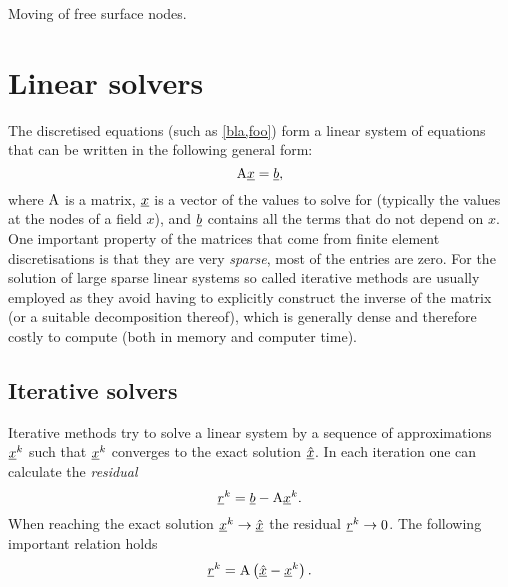 Moving of free surface nodes.

\section{Linear solvers} \label{ND_Linear_solvers}
The discretised equations (such as \eqref{bla,foo}) form
a linear system of equations that can be written
in the following general form:
\begin{equation*}
  \mathrm{A}\underline{x}=\underline{b},
\end{equation*}
where $\mathrm{A}$ is a matrix, $\underline{x}$ is a vector of the values
to solve for (typically the values at the nodes of a field $x$),
and $\underline{b}$ contains all the terms that do not depend on
$x$. One important property of the matrices that come from
finite element discretisations is that they are very \emph{sparse},
\ie most of the entries are zero. For the solution of large
sparse linear systems so called iterative methods are usually employed
as they
avoid having to explicitly construct the inverse of the matrix
(or a suitable decomposition thereof),
which is generally dense and therefore costly to compute
(both in memory and computer time).

\subsection{Iterative solvers}
Iterative methods try to solve a linear system by a sequence
of approximations $\underline{x}^k$ such that $\underline{x}^k$ converges to
the exact solution $\underline{\hat x}$. In each iteration one can
calculate the \emph{residual}
\begin{equation*}
  \underline{r}^k = \underline{b} - \mathrm{A}\underline{x}^k.
\end{equation*}
When reaching the exact solution $\underline{x}^k\to\underline{\hat x}$ the
residual $\underline{r}^k\to 0$. The following important relation holds
\begin{equation}\label{eq:residual_error}
  \underline{r}^k = \mathrm{A}\left( \underline{\hat x} - \underline{x}^k \right).
\end{equation}

